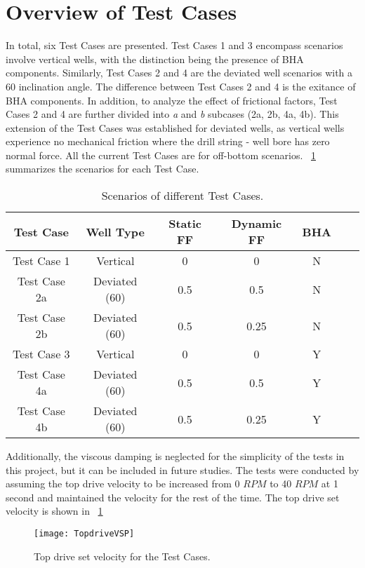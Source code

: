 \section{Overview of Test Cases}
In total, six Test Cases are presented. Test Cases 1 and 3 encompass scenarios involve vertical wells, with the distinction being the presence of BHA components. Similarly, Test Cases 2 and 4 are the deviated well scenarios with a 60\textdegree{} inclination angle. The difference between Test Cases 2 and 4 is the exitance of BHA components. In addition, to analyze the effect of frictional factors, Test Cases 2 and 4 are further divided into \emph{a} and \emph{b} subcases (2a, 2b, 4a, 4b). This extension of the Test Cases was established for deviated wells, as vertical wells experience no mechanical friction where the drill string - well bore has zero normal force. \wording{} All the current Test Cases are for off-bottom scenarios. \tablename~\ref{Test_case_summary} summarizes the scenarios for each Test Case.
\begin{table}
    \centering
    \begin{tabular}{|c|c|c|c|c|c|c|}
        \hline
        \textbf{Test Case} & \textbf{Well Type} & \textbf{Static FF} & \textbf{Dynamic FF}& \textbf{BHA}\\
        \hline
        Test Case 1 & Vertical & 0 & 0 & N\\
        \hline
        Test Case 2a & Deviated (60\textdegree{}) & 0.5 & 0.5 & N \\
        \hline
        Test Case 2b & Deviated (60\textdegree{}) & 0.5 & 0.25 & N \\
        \hline
        Test Case 3 & Vertical & 0 & 0 & Y \\
        \hline
        Test Case 4a & Deviated (60\textdegree{}) & 0.5 & 0.5 & Y \\
        \hline
        Test Case 4b & Deviated (60\textdegree{}) & 0.5 & 0.25 & Y \\
        \hline
    \end{tabular}
    \caption[Scenarios of different Test Cases]{Scenarios of different Test Cases.}
    \label{Test_case_summary}
\end{table}
Additionally, the viscous damping  is neglected for the simplicity of the tests in this project, but it can be included in future studies.  The tests were conducted by assuming the top drive velocity to be increased from 0 $RPM$ to 40 $RPM$ at 1 second and maintained the velocity for the rest of the time. The top drive set velocity is shown in \figurename~\ref{figure_topdrive_VSP}
\begin{figure}
  \centering
  \texttt{[image: TopdriveVSP]}
  \caption[Top drive set velocity for the Test Cases]{Top drive set velocity for the Test Cases.}\label{figure_topdrive_VSP}
\end{figure}

